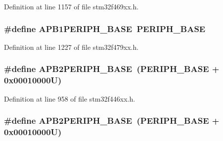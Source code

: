 Definition at line 1157 of file stm32f469xx.\+h.

\subsubsection[{\texorpdfstring{A\+P\+B1\+P\+E\+R\+I\+P\+H\+\_\+\+B\+A\+SE}{APB1PERIPH_BASE}}]{\setlength{\rightskip}{0pt plus 5cm}\#define A\+P\+B1\+P\+E\+R\+I\+P\+H\+\_\+\+B\+A\+SE~{\bf P\+E\+R\+I\+P\+H\+\_\+\+B\+A\+SE}}\hypertarget{group___peripheral__memory__map_ga45666d911f39addd4c8c0a0ac3388cfb}{}\label{group___peripheral__memory__map_ga45666d911f39addd4c8c0a0ac3388cfb}


Definition at line 1227 of file stm32f479xx.\+h.

\subsubsection[{\texorpdfstring{A\+P\+B2\+P\+E\+R\+I\+P\+H\+\_\+\+B\+A\+SE}{APB2PERIPH_BASE}}]{\setlength{\rightskip}{0pt plus 5cm}\#define A\+P\+B2\+P\+E\+R\+I\+P\+H\+\_\+\+B\+A\+SE~({\bf P\+E\+R\+I\+P\+H\+\_\+\+B\+A\+SE} + 0x00010000\+U)}\hypertarget{group___peripheral__memory__map_ga25b99d6065f1c8f751e78f43ade652cb}{}\label{group___peripheral__memory__map_ga25b99d6065f1c8f751e78f43ade652cb}


Definition at line 958 of file stm32f446xx.\+h.

\subsubsection[{\texorpdfstring{A\+P\+B2\+P\+E\+R\+I\+P\+H\+\_\+\+B\+A\+SE}{APB2PERIPH_BASE}}]{\setlength{\rightskip}{0pt plus 5cm}\#define A\+P\+B2\+P\+E\+R\+I\+P\+H\+\_\+\+B\+A\+SE~({\bf P\+E\+R\+I\+P\+H\+\_\+\+B\+A\+SE} + 0x00010000\+U)}\hypertarget{group___peripheral__memory__map_ga25b99d6065f1c8f751e78f43ade652cb}{}\label{group___peripheral__memory__map_ga25b99d6065f1c8f751e78f43ade652cb}



